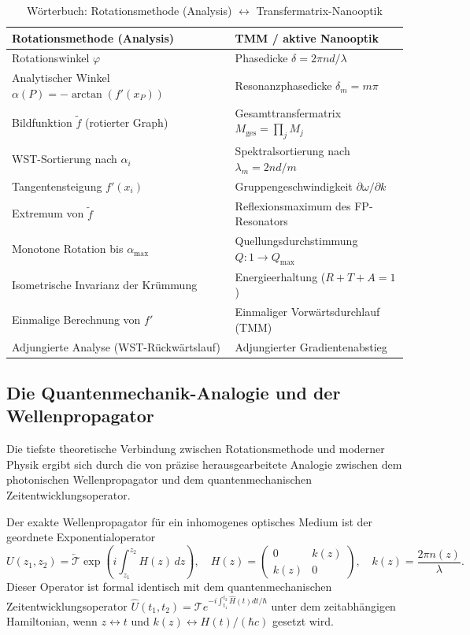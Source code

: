 ﻿\documentclass[12pt, a4paper]{article}
\theoremstyle{definition}
\begin{document}
	\begin{table}[H]
		\centering
		\caption{Wörterbuch: Rotationsmethode (Analysis) $\leftrightarrow$ Transfermatrix-Nanooptik}
		\renewcommand{\arraystretch}{1.4}
		\begin{tabular}{ll}
			\toprule
			\textbf{Rotationsmethode (Analysis)} & \textbf{TMM / aktive Nanooptik \cite{oqtum}} \\
			\midrule
			Rotationswinkel $\varphi$ & Phasedicke $\delta = 2\pi n d / \lambda$ \\
			Analytischer Winkel $\alpha(P) = -\arctan(f'(x_P))$ & Resonanzphasedicke $\delta_m = m\pi$ \\
			Bildfunktion $\tilde{f}$ (rotierter Graph) & Gesamttransfermatrix $M_\mathrm{ges} = \prod_j M_j$ \\
			WST-Sortierung nach $\alpha_i$ & Spektralsortierung nach $\lambda_m = 2nd/m$ \\
			Tangentensteigung $f'(x_i)$ & Gruppengeschwindigkeit $\partial\omega/\partial k$ \\
			Extremum von $\tilde{f}$ & Reflexionsmaximum des FP-Resonators \\
			Monotone Rotation bis $\alpha_\mathrm{max}$ & Quellungsdurchstimmung $Q: 1 \to Q_\mathrm{max}$ \\
			Isometrische Invarianz der Krümmung & Energieerhaltung ($R + T + A = 1$) \\
			Einmalige Berechnung von $f'$ & Einmaliger Vorwärtsdurchlauf (TMM) \\
			Adjungierte Analyse (WST-Rückwärtslauf) & Adjungierter Gradientenabstieg \cite{oqtum} \\
			\bottomrule
		\end{tabular}
	\end{table}
	
	\subsection{Die Quantenmechanik-Analogie und der Wellenpropagator}
	
	Die tiefste theoretische Verbindung zwischen Rotationsmethode und moderner
	Physik ergibt sich durch die von \cite{oqtum} präzise herausgearbeitete
	Analogie zwischen dem photonischen Wellenpropagator und dem
	quantenmechanischen Zeitentwicklungsoperator.
	
	Der exakte Wellenpropagator für ein inhomogenes optisches Medium ist der
	geordnete Exponentialoperator
	\[
	U(z_1, z_2) = \overleftarrow{\mathcal{T}}\exp\!\left(
	i\int_{z_1}^{z_2} H(z)\,dz
	\right), \quad
	H(z) = \begin{pmatrix}0 & k(z) \\ k(z) & 0\end{pmatrix},
	\quad k(z) = \frac{2\pi n(z)}{\lambda}.
	\]
	Dieser Operator ist formal identisch mit dem quantenmechanischen
	Zeitentwicklungsoperator $\hat{U}(t_1, t_2) = \mathcal{T}e^{-i\int_{t_1}^{t_2}\hat{H}(t)dt/\hbar}$
	unter dem zeitabhängigen Hamiltonian, wenn $z \leftrightarrow t$ und
	$k(z) \leftrightarrow H(t)/(\hbar c)$ gesetzt wird.
	
\end{document}

